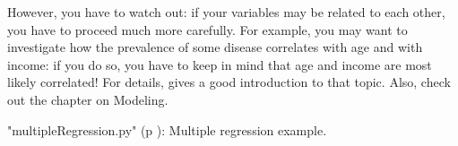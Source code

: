 However, you have to watch out: if your variables may be related to each other, you have to proceed much more carefully. For example, you may want to investigate how the prevalence of some disease correlates with age and with income: if you do so, you have to keep in mind that age and income are most likely correlated! For details, \cite{Kaplan2009} gives a good introduction to that topic. Also, check out the chapter on Modeling.

\PyImg "multipleRegression.py" (p \pageref{py:multipleRegression}): Multiple regression example.
